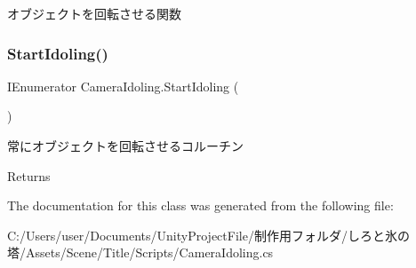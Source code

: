 オブジェクトを回転させる関数 

\mbox{\label{class_camera_idoling_ad2377166d119d4397a2680df6e521b02}} 
\subsubsection{\texorpdfstring{Start\+Idoling()}{StartIdoling()}}
{\footnotesize\ttfamily I\+Enumerator Camera\+Idoling.\+Start\+Idoling (\begin{DoxyParamCaption}{ }\end{DoxyParamCaption})\hspace{0.3cm}{\ttfamily [inline]}}



常にオブジェクトを回転させるコルーチン 

\begin{DoxyReturn}{Returns}

\end{DoxyReturn}


The documentation for this class was generated from the following file\+:\begin{DoxyCompactItemize}
\item 
C\+:/\+Users/user/\+Documents/\+Unity\+Project\+File/制作用フォルダ/しろと氷の塔/\+Assets/\+Scene/\+Title/\+Scripts/Camera\+Idoling.\+cs\end{DoxyCompactItemize}
